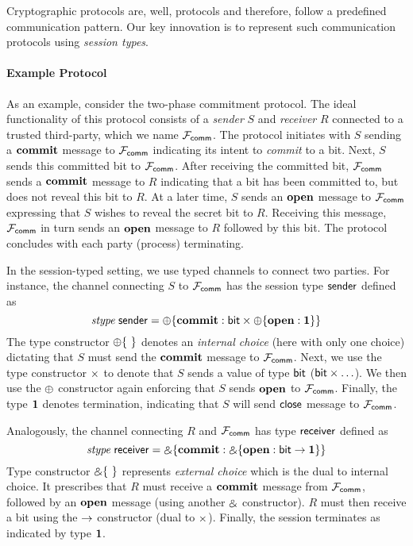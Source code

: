 
Cryptographic protocols are, well, protocols and therefore, follow
a predefined communication pattern.
Our key innovation is to represent such communication protocols using
\emph{session types}.

\paragraph*{\textbf{Example Protocol}}
As an example, consider the two-phase commitment protocol.
The ideal functionality of this protocol consists of a \emph{sender} $S$
and \emph{receiver} $R$ connected to a trusted third-party, which we
name $\mathcal{F}_{{\mathsf {comm}}}$.
The protocol initiates with $S$ sending a $\mathbf{commit}$ message to $\mathcal{F}_{{\mathsf {comm}}}$
indicating its intent to \emph{commit} to a bit.
Next, $S$ sends this committed bit to $\mathcal{F}_{{\mathsf {comm}}}$.
After receiving the committed bit, $\mathcal{F}_{{\mathsf {comm}}}$ sends a $\mathbf{commit}$ message
to $R$ indicating that a bit has been committed to, but does not reveal
this bit to $R$.
At a later time, $S$ sends an $\mathbf{open}$ message to $\mathcal{F}_{{\mathsf {comm}}}$ expressing
that $S$ wishes to reveal the secret bit to $R$.
Receiving this message, $\mathcal{F}_{{\mathsf {comm}}}$ in turn sends an $\mathbf{open}$ message
to $R$ followed by this bit.
The protocol concludes with each party (process) terminating.

In the session-typed setting, we use typed channels to connect two
parties. For instance, the channel connecting $S$ to $\mathcal{F}_{{\mathsf {comm}}}$
has the session type $\mathsf{sender}$ defined as
\[
  \relax{\it stype} \; \mathsf{sender} = \oplus \{ \mathbf{commit} : \mathsf{bit} \times
  \oplus \{ \mathbf{open} : \mathbf{1} \} \}
\]
The type constructor $\ichoice$ denotes an \emph{internal choice}
(here with only one choice) dictating that $S$ must send the
$\mathbf{commit}$ message to $\mathcal{F}_{{\mathsf {comm}}}$.
Next, we use the type constructor $\times$ to denote that $S$
sends a value of type $\mathsf{bit}$ ($\mathsf{bit} \times \ldots$).
We then use the $\oplus$ constructor again enforcing
that $S$ sends $\mathbf{open}$ to $\mathcal{F}_{{\mathsf {comm}}}$.
Finally, the type $\mathbf{1}$ denotes termination, indicating that
$S$ will send $\mathsf{close}$ message to $\mathcal{F}_{{\mathsf {comm}}}$.

Analogously, the channel connecting $R$ and $\mathcal{F}_{{\mathsf {comm}}}$ has
type $\mathsf{receiver}$ defined as
\[
  \relax{\it stype} \; \mathsf{receiver} = \mathbin{\binampersand} \{ \mathbf{commit} : 
  \mathbin{\binampersand} \{ \mathbf{open} : \mathsf{bit} \rightarrow \mathbf{1} \} \}
\]
Type constructor $\echoice$ represents \emph{external choice}
which is the dual to internal choice.
It prescribes that $R$ must receive a $\mathbf{commit}$ message from $\mathcal{F}_{{\mathsf {comm}}}$,
followed by an $\mathbf{open}$ message (using another $\mathbin{\binampersand}$ constructor).
$R$ must then receive a bit using the $\rightarrow$ constructor (dual to
$\times$).
Finally, the session terminates as indicated by type $\mathbf{1}$.

